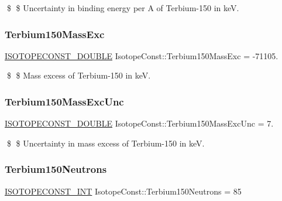 \$ \$ Uncertainty in binding energy per A of Terbium-\/150 in keV. \mbox{\label{group___isotope_const-_terbium-_tb150_ga22f883adcaed5b7dceaab6eadb18da9e}} 
\subsubsection{\texorpdfstring{Terbium150\+Mass\+Exc}{Terbium150MassExc}}
{\footnotesize\ttfamily \mbox{\hyperlink{group___isotope_const-_macros_ga8f45a7272ce02c0b4c65c44636ed719a}{I\+S\+O\+T\+O\+P\+E\+C\+O\+N\+S\+T\+\_\+\+D\+O\+U\+B\+LE}} Isotope\+Const\+::\+Terbium150\+Mass\+Exc = -\/71105.}

\$ \$ Mass excess of Terbium-\/150 in keV. \mbox{\label{group___isotope_const-_terbium-_tb150_ga4a984e4dda5d6c981d1dc28a24ee0cab}} 
\subsubsection{\texorpdfstring{Terbium150\+Mass\+Exc\+Unc}{Terbium150MassExcUnc}}
{\footnotesize\ttfamily \mbox{\hyperlink{group___isotope_const-_macros_ga8f45a7272ce02c0b4c65c44636ed719a}{I\+S\+O\+T\+O\+P\+E\+C\+O\+N\+S\+T\+\_\+\+D\+O\+U\+B\+LE}} Isotope\+Const\+::\+Terbium150\+Mass\+Exc\+Unc = 7.}

\$ \$ Uncertainty in mass excess of Terbium-\/150 in keV. \mbox{\label{group___isotope_const-_terbium-_tb150_gad0cc22186aa04a549c18ca7c902905bb}} 
\subsubsection{\texorpdfstring{Terbium150\+Neutrons}{Terbium150Neutrons}}
{\footnotesize\ttfamily \mbox{\hyperlink{group___isotope_const-_macros_ga5f18360b3e99483a35c32d789e62621c}{I\+S\+O\+T\+O\+P\+E\+C\+O\+N\+S\+T\+\_\+\+I\+NT}} Isotope\+Const\+::\+Terbium150\+Neutrons = 85}

